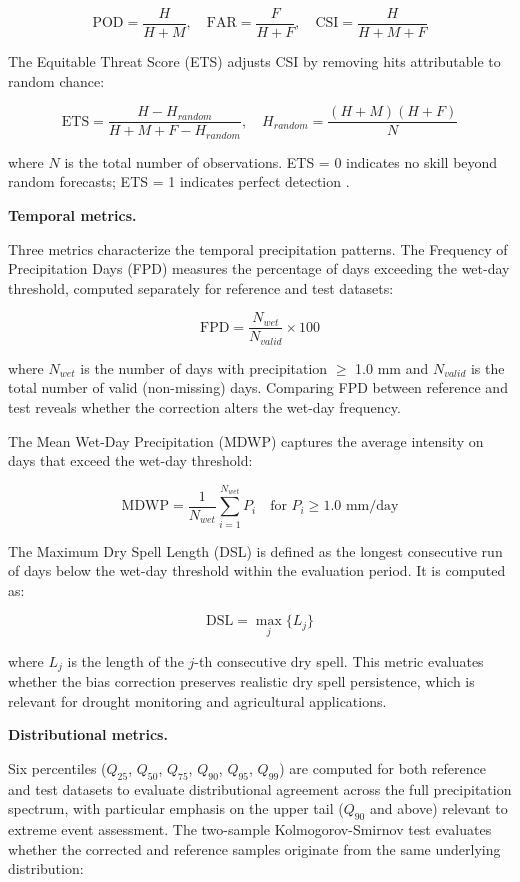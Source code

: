 \documentclass[remotesensing,article,submit,pdftex,moreauthors]{Definitions/mdpi}
\begin{document}
\[\text{POD} = \frac{H}{H + M}, \quad \text{FAR} = \frac{F}{H + F}, \quad \text{CSI} = \frac{H}{H + M + F}\]

The Equitable Threat Score (ETS) adjusts CSI by removing hits
attributable to random chance:

\[\text{ETS} = \frac{H - H_{random}}{H + M + F - H_{random}}, \quad H_{random} = \frac{(H + M)(H + F)}{N}\]

where \(N\) is the total number of observations. ETS = 0 indicates no
skill beyond random forecasts; ETS = 1 indicates perfect detection
\cite{ref15}.

\textbf{Temporal metrics.}

Three metrics characterize the temporal precipitation patterns. The
Frequency of Precipitation Days (FPD) measures the percentage of days
exceeding the wet-day threshold, computed separately for reference and
test datasets:

\[\text{FPD} = \frac{N_{wet}}{N_{valid}} \times 100\]

where \(N_{wet}\) is the number of days with precipitation \(\geq\) 1.0
mm and \(N_{valid}\) is the total number of valid (non-missing) days.
Comparing FPD between reference and test reveals whether the correction
alters the wet-day frequency.

The Mean Wet-Day Precipitation (MDWP) captures the average intensity on
days that exceed the wet-day threshold:

\[\text{MDWP} = \frac{1}{N_{wet}} \sum_{i=1}^{N_{wet}} P_i \quad \text{for } P_i \geq 1.0 \text{ mm/day}\]

The Maximum Dry Spell Length (DSL) is defined as the longest consecutive
run of days below the wet-day threshold within the evaluation period. It
is computed as:

\[\text{DSL} = \max_{j} \{ L_j \}\]

where \(L_j\) is the length of the \(j\)-th consecutive dry spell. This
metric evaluates whether the bias correction preserves realistic dry
spell persistence, which is relevant for drought monitoring and
agricultural applications.

\textbf{Distributional metrics.}

Six percentiles (\(Q_{25}\), \(Q_{50}\), \(Q_{75}\), \(Q_{90}\),
\(Q_{95}\), \(Q_{99}\)) are computed for both reference and test
datasets to evaluate distributional agreement across the full
precipitation spectrum, with particular emphasis on the upper tail
(\(Q_{90}\) and above) relevant to extreme event assessment. The
two-sample Kolmogorov-Smirnov test evaluates whether the corrected and
reference samples originate from the same underlying distribution:
\end{document}
